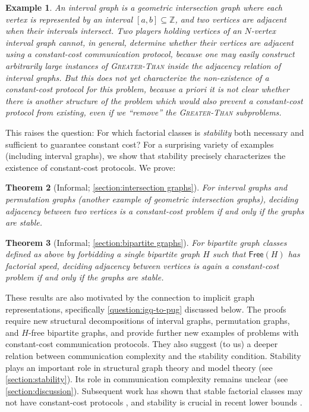 \documentclass{article}
\newtheorem{theorem}{Theorem}\newtheorem{lemma}[theorem]{Lemma}\newtheorem{proposition}[theorem]{Proposition}\newtheorem{corollary}[theorem]{Corollary}\newtheorem{definition}[theorem]{Definition}\newtheorem{claim}[theorem]{Claim}\newtheorem{remark}[theorem]{Remark}\newtheorem{observation}[theorem]{Observation}\newtheorem{conjecture}[theorem]{Conjecture}\newtheorem{example}[theorem]{Example}
\newcommand{\bZ}{\ensuremath{\mathbb{Z}}}
\newcommand{\free}{\mathsf{Free}}
\begin{document}
\begin{example}
\label{example:interval-graph}
An interval graph is a geometric intersection graph where each vertex is represented by an interval
$[a,b] \subseteq \bZ$, and two vertices are adjacent when their intervals intersect. Two players
holding vertices of an $N$-vertex interval graph cannot, in general, determine whether their
vertices are adjacent using a constant-cost communication protocol, because one may easily construct
arbitrarily large instances of \textsc{Greater-Than} inside the adjacency relation of interval
graphs.
But this does not yet characterize the non-existence of a constant-cost protocol for this
problem, because \emph{a priori} it is not clear whether there is another structure of the problem
which would \emph{also} prevent a constant-cost protocol from existing, even if we ``remove'' the
\textsc{Greater-Than} subproblems.
\end{example}

This raises the question: For which factorial classes is \emph{stability} both necessary and
sufficient to guarantee constant cost?  For a surprising variety of examples (including interval
graphs), we show that stability precisely characterizes the existence of constant-cost protocols.
We prove:
\begin{theorem}[Informal; \cref{section:intersection graphs}]
\label{thm:intro-intersection}
For interval graphs and permutation graphs (another example of geometric intersection
graphs), deciding adjacency between two vertices is a
constant-cost problem if and only if the graphs are stable. 
\end{theorem}

\begin{theorem}[Informal; \cref{section:bipartite graphs}]
\label{thm:intro-monogenic}
For bipartite graph classes defined as above by forbidding a single bipartite graph
$H$ such that $\free(H)$ has factorial speed, deciding adjacency between vertices is again a
constant-cost problem if and only if the graphs are stable. 
\end{theorem}
These results are also motivated by the connection to implicit graph representations, specifically
\cref{question:igq-to-pug} discussed below. The proofs require new structural decompositions
of interval graphs, permutation graphs, and $H$-free bipartite graphs, and provide further new
examples of problems with constant-cost communication protocols. They also suggest (to us) a deeper
relation between communication complexity and the stability condition.  Stability plays an important
role in structural graph theory and model theory (see \cref{section:stability}). Its role in
communication complexity remains unclear (see \cref{section:discussion}). Subsequent work has shown
that stable factorial classes may not have constant-cost protocols \cite{HHH22counter,EHK22},
and stability is crucial in recent lower bounds \cite{FHHH24}.
\end{document}
